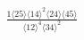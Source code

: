 \documentclass[varwidth, border=5pt]{standalone}
\begin{document}
\begin{my}
$\begin{gathered}
\scriptscriptstyle\frac{1⟨25⟩⟨14⟩^2⟨24⟩⟨45⟩}{⟨12⟩^4⟨34⟩^2}
\end{gathered}$
\end{my}
\end{document}
